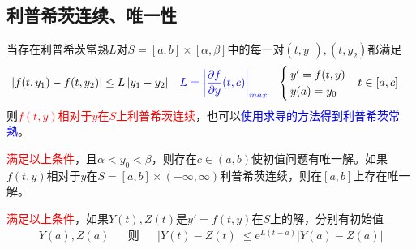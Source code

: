 \documentclass[twocolumn]{article}
\begin{document}
\subsection{利普希茨连续、唯一性}
当存在利普希茨常熟$L$对$S=[a,b]\times[\alpha,\beta]$中的每一对$(t,y_1),(t,y_2)$都满足
\begin{align*}
    \left| f(t,y_1)-f(t,y_2) \right| &\leq L\left| y_1-y_2 \right|&&\textcolor{blue}{L=\left| \frac{\partial f}{\partial y}(t,c) \right|_{max}}& 
    \begin{cases}
        y'=f(t,y)\\
        y(a)=y_0
    \end{cases}
    &t\in[a,c]
\end{align*}
则\textcolor{red}{$f(t,y)$相对于$y$在$S$上利普希茨连续}，也可以\textcolor{blue}{使用求导的方法得到利普希茨常熟}。

\textcolor{red}{满足以上条件}，且$\alpha<y_0<\beta$，则存在$c\in(a,b)$使初值问题有唯一解。如果$f(t,y)$相对于$y$在$S=[a,b]\times(-\infty,\infty)$利普希茨连续，则在$[a,b]$上存在唯一解。

\textcolor{red}{满足以上条件}，如果$Y(t),Z(t)$是$y'=f(t,y)$在$S$上的解，分别有初始值
\begin{align*}
    Y(a),Z(a)&&\text{则}&&
    \left| Y(t)-Z(t) \right| \leqslant \mathrm{e}^{L(t-a)} \left| Y(a)-Z(a) \right|
\end{align*}
\end{document}
